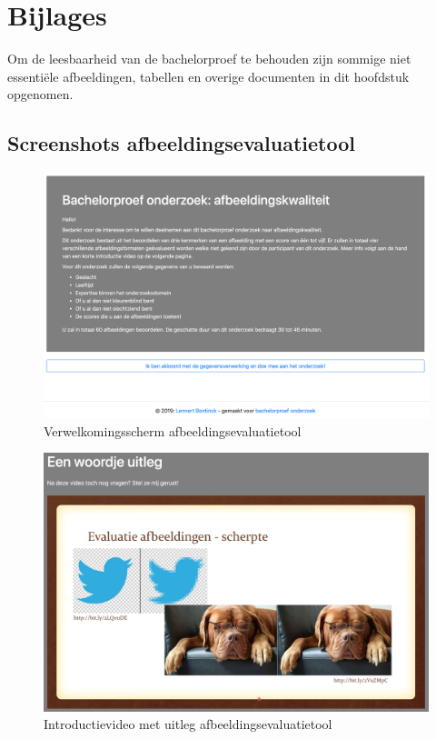 \chapter{Bijlages}
\label{ch:bijlages}

Om de leesbaarheid van de bachelorproef te behouden zijn sommige niet essentiële afbeeldingen, tabellen en overige documenten in dit hoofdstuk opgenomen. 

\section{Screenshots afbeeldingsevaluatietool}
\label{sec:bijlages-screenshot-afbeeldingsevaluatietool}

\begin{figure}
	\includegraphics[width=\linewidth]{img/bijlages/afbeeldingsevaluatietool/welkom.png}
	\caption{Verwelkomingsscherm  \gls{afbeeldingsevaluatietool}}
	\label{fig:bijlages-screenshot-afbeeldingsevaluatietool-welkom}
\end{figure}

\begin{figure}	
	\includegraphics[width=\linewidth]{img/bijlages/afbeeldingsevaluatietool/video.png}
	\caption{Introductievideo met uitleg \gls{afbeeldingsevaluatietool}}
	\label{fig:bijlages-screenshot-afbeeldingsevaluatietool-video}
\end{figure}


